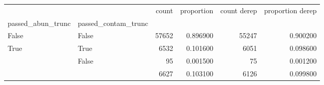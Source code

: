 \begin{tabular}{llrrrr}
\toprule
 &  & count & proportion & count derep & proportion derep \\
passed_abun_trunc & passed_contam_trunc &  &  &  &  \\
\midrule
False & False & 57652 & 0.896900 & 55247 & 0.900200 \\
\cline{1-6}
\multirow[t]{3}{*}{True} & True & 6532 & 0.101600 & 6051 & 0.098600 \\
 & False & 95 & 0.001500 & 75 & 0.001200 \\
 &  & 6627 & 0.103100 & 6126 & 0.099800 \\
\cline{1-6}
\bottomrule
\end{tabular}
